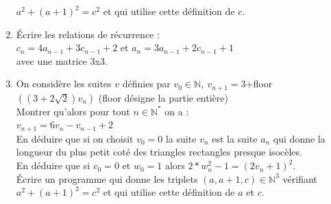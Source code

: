 \documentclass[a4paper,11pt]{book}
\newcommand{\N}{{\mathbb{N}}}
\begin{document}
\begin{enumerate}
$a^2+(a+1)^2=c^2$ et qui utilise cette d\'efinition de $c$.
\item \'Ecrire les relations de r\'ecurrence :\\
$c_n=4a_{n-1}+3c_{n-1}+2$ et $a_n=3a_{n-1}+2c_{n-1}+1$\\ 
avec une matrice 3x3.
\item On consid\`ere les suites $v$ d\'efinies par
$v_0\in \N,\ v_{n+1}=$3+floor$((3+2\sqrt 2)v_n)$ (floor d\'esigne la 
partie enti\`ere)\\
Montrer qu'alors pour tout $n\in \N^*$ on a :\\
$v_{n+1}=6v_n-v_{n-1}+2$\\
En d\'eduire que si on choisit $v_0=0$ la suite $v_n$ est la suite  
$a_n$ qui donne la longueur du plus petit cot\'e des triangles rectangles 
presque isoc\`eles.\\
En d\'eduire que si $v_0=0$ et $w_0=1$ alors $2*w_n^2-1=(2v_n+1)^2$.\\
\'Ecrire un programme qui donne les triplets $(a,a+1,c)\in \N^3$ v\'erifiant 
$a^2+(a+1)^2=c^2$ et qui utilise cette d\'efinition de $a$ et $c$.
\end{enumerate}
\end{document}
